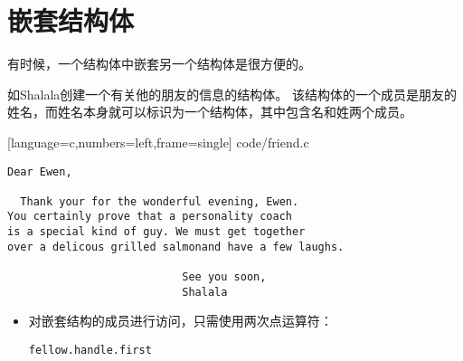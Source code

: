 \section{嵌套结构体}
\begin{frame}[fragile]\ft{\secname}
有时候，一个结构体中嵌套另一个结构体是很方便的。\vspace{0.1in}

如{\tf Shalala}创建一个有关他的朋友的信息的结构体。
该结构体的一个成员是朋友的姓名，而姓名本身就可以标识为一个结构体，其中包含名和姓两个成员。
\end{frame}


\begin{frame}\ft{\secname}

[language=c,numbers=left,frame=single]
{code/friend.c}
\end{frame}


\begin{frame}[fragile]\ft{\secname}
    \begin{lstlisting}[backgroundcolor=\color{blue!20}]
Dear Ewen, 

  Thank your for the wonderful evening, Ewen.
You certainly prove that a personality coach
is a special kind of guy. We must get together
over a delicous grilled salmonand have a few laughs.

                           See you soon, 
                           Shalala
\end{lstlisting}
\end{frame}

\begin{frame}[fragile]\ft{\secname}
  \begin{itemize}
  \item 对嵌套结构的成员进行访问，只需使用两次点运算符：
    \begin{lstlisting}[basicstyle=\ttfamily]
fellow.handle.first      
    \end{lstlisting}
  \end{itemize}
\end{frame}
